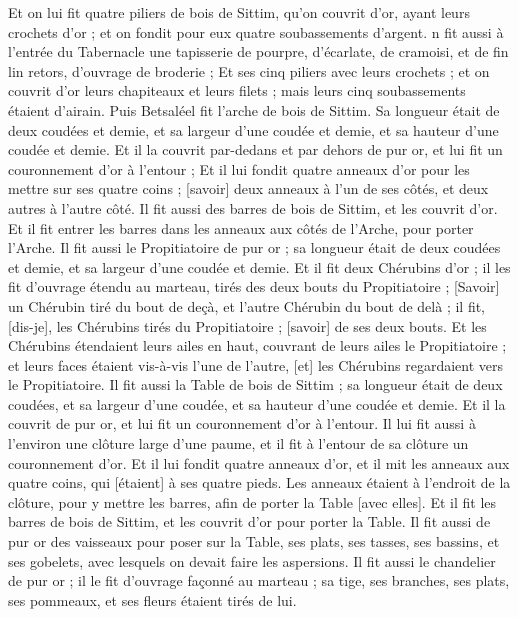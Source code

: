 \begin{multicols}{2}
Et on lui fit quatre piliers de bois de Sittim, qu'on couvrit d'or, ayant leurs crochets d'or ; et on fondit pour eux quatre soubassements d'argent.
n fit aussi à l'entrée du Tabernacle une tapisserie de pourpre, d'écarlate, de cramoisi, et de fin lin retors, d'ouvrage de broderie ;
Et ses cinq piliers avec leurs crochets ; et on couvrit d'or leurs chapiteaux et leurs filets ; mais leurs cinq soubassements étaient d'airain.
\VerseOne{}Puis Betsaléel fit l'arche de bois de Sittim. Sa longueur était de deux coudées et demie, et sa largeur d'une coudée et demie, et sa hauteur d'une coudée et demie.
Et il la couvrit par-dedans et par dehors de pur or, et lui fit un couronnement d'or à l’entour ;
Et il lui fondit quatre anneaux d'or pour les mettre sur ses quatre coins ; [savoir] deux anneaux à l'un de ses côtés, et deux autres à l'autre côté.
Il fit aussi des barres de bois de Sittim, et les couvrit d'or.
Et il fit entrer les barres dans les anneaux aux côtés de l'Arche, pour porter l'Arche.
Il fit aussi le Propitiatoire de pur or ; sa longueur était de deux coudées et demie, et sa largeur d'une coudée et demie.
Et il fit deux Chérubins d'or ; il les fit d'ouvrage étendu au marteau, tirés des deux bouts du Propitiatoire ;
[Savoir] un Chérubin tiré du bout de deçà, et l'autre Chérubin du bout de delà ; il fit, [dis-je], les Chérubins tirés du Propitiatoire ; [savoir] de ses deux bouts.
Et les Chérubins étendaient leurs ailes en haut, couvrant de leurs ailes le Propitiatoire ; et leurs faces étaient vis-à-vis l'une de l'autre, [et] les Chérubins regardaient vers le Propitiatoire.
Il fit aussi la Table de bois de Sittim ; sa longueur était de deux coudées, et sa largeur d'une coudée, et sa hauteur d'une coudée et demie.
Et il la couvrit de pur or, et lui fit un couronnement d'or à l’entour.
Il lui fit aussi à l'environ une clôture large d'une paume, et il fit à l'entour de sa clôture un couronnement d'or.
Et il lui fondit quatre anneaux d'or, et il mit les anneaux aux quatre coins, qui [étaient] à ses quatre pieds.
Les anneaux étaient à l'endroit de la clôture, pour y mettre les barres, afin de porter la Table [avec elles].
Et il fit les barres de bois de Sittim, et les couvrit d'or pour porter la Table.
Il fit aussi de pur or des vaisseaux pour poser sur la Table, ses plats, ses tasses, ses bassins, et ses gobelets, avec lesquels on devait faire les aspersions.
Il fit aussi le chandelier de pur or ; il le fit d'ouvrage façonné au marteau ; sa tige, ses branches, ses plats, ses pommeaux, et ses fleurs étaient tirés de lui.

\end{multicols}
